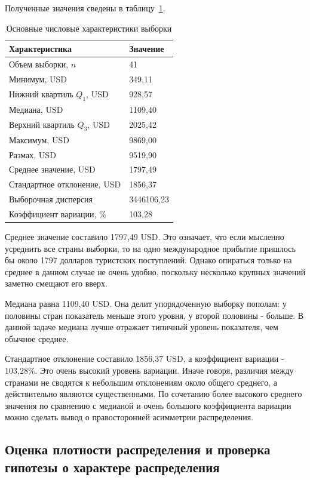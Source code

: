 \documentclass[14pt,a4paper]{extarticle}
\begin{document}
Полученные значения сведены в таблицу~\ref{tab:desc}.

\begin{table}[H]
\centering
\caption{Основные числовые характеристики выборки}
\label{tab:desc}
\begin{tabular}{|p{7.5cm}|p{4cm}|}
\hline
Характеристика & Значение \\ \hline
Объем выборки, $n$ & 41 \\ \hline
Минимум, USD & 349,11 \\ \hline
Нижний квартиль $Q_1$, USD & 928,57 \\ \hline
Медиана, USD & 1109,40 \\ \hline
Верхний квартиль $Q_3$, USD & 2025,42 \\ \hline
Максимум, USD & 9869,00 \\ \hline
Размах, USD & 9519,90 \\ \hline
Среднее значение, USD & 1797,49 \\ \hline
Стандартное отклонение, USD & 1856,37 \\ \hline
Выборочная дисперсия & 3446106,23 \\ \hline
Коэффициент вариации, \% & 103,28 \\ \hline
\end{tabular}
\end{table}

Среднее значение составило 1797,49 USD. Это означает, что если мысленно усреднить все страны выборки, то на одно международное прибытие пришлось бы около 1797 долларов туристских поступлений. Однако опираться только на среднее в данном случае не очень удобно, поскольку несколько крупных значений заметно смещают его вверх.

Медиана равна 1109,40 USD. Она делит упорядоченную выборку пополам: у половины стран показатель меньше этого уровня, у второй половины - больше. В данной задаче медиана лучше отражает типичный уровень показателя, чем обычное среднее.

Стандартное отклонение составило 1856,37 USD, а коэффициент вариации - 103,28\%. Это очень высокий уровень вариации. Иначе говоря, различия между странами не сводятся к небольшим отклонениям около общего среднего, а действительно являются существенными. По сочетанию более высокого среднего значения по сравнению с медианой и очень большого коэффициента вариации можно сделать вывод о правосторонней асимметрии распределения.

\subsection{Оценка плотности распределения и проверка гипотезы о характере распределения}
\end{document}
